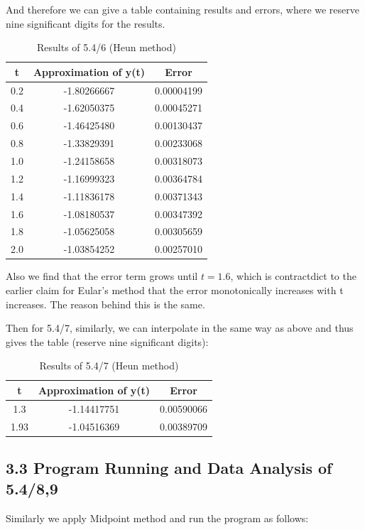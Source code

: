 \documentclass{article}
\begin{document}
    And therefore we can give a table containing results and errors, where we reserve nine significant digits for the results.

    \begin{table}[htbp]
    \centering
    \caption{Results of 5.4/6 (Heun method)}
    \begin{tabular}{c|c|c}
    \toprule
    t& \textbf{Approximation of y(t)} & \textbf{Error} \\ 
    \midrule
    0.2 & -1.80266667 & 0.00004199\\
    0.4 & -1.62050375 & 0.00045271\\
    0.6 & -1.46425480 & 0.00130437\\
    0.8 & -1.33829391 & 0.00233068\\
    1.0 & -1.24158658 & 0.00318073\\
    1.2 & -1.16999323 & 0.00364784\\
    1.4 & -1.11836178 & 0.00371343\\
    1.6 & -1.08180537 & 0.00347392\\
    1.8 & -1.05625058 & 0.00305659\\
    2.0 & -1.03854252 & 0.00257010\\
    \bottomrule
    \end{tabular}
    \end{table}

    Also we find that the error term grows until $t=1.6$, which is contractdict to the earlier claim for Eular's method that the error monotonically increases with t increases. The reason behind this is the same.

    Then for  5.4/7, similarly, we can interpolate in the same way as above and thus gives the table (reserve nine significant digits):
    \begin{table}[htbp]
    \centering
    \caption{Results of 5.4/7 (Heun method)}
    \begin{tabular}{c|c|c}
    \toprule
    t& \textbf{Approximation of y(t)} & \textbf{Error} \\ 
    \midrule
    1.3 & -1.14417751 & 0.00590066 \\
    1.93 & -1.04516369 & 0.00389709 \\
    \bottomrule
    \end{tabular}
    \end{table}

\subsection{3.3 Program Running and Data Analysis of 5.4/8,9} 
    Similarly we apply Midpoint method and run the program as follows:
\end{document}
